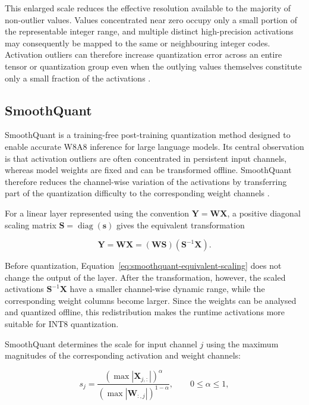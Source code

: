 This enlarged scale reduces the effective resolution available to the
majority of non-outlier values. Values concentrated near zero occupy
only a small portion of the representable integer range, and multiple
distinct high-precision activations may consequently be mapped to the
same or neighbouring integer codes. Activation outliers can therefore
increase quantization error across an entire tensor or quantization
group even when the outlying values themselves constitute only a small
fraction of the activations
\cite{xiao2023icml-smoothquant}.

\subsection{SmoothQuant}
SmoothQuant is a training-free post-training quantization method
designed to enable accurate W8A8 inference for large language models.
Its central observation is that activation outliers are often
concentrated in persistent input channels, whereas model weights are
fixed and can be transformed offline. SmoothQuant therefore reduces
the channel-wise variation of the activations by transferring part of
the quantization difficulty to the corresponding weight channels
\cite{xiao2023smoothquant}.

For a linear layer represented using the convention
\(\mathbf{Y}=\mathbf{W}\mathbf{X}\), a positive diagonal scaling matrix
\(\mathbf{S}=\operatorname{diag}(\mathbf{s})\) gives the equivalent
transformation

\begin{equation}
\mathbf{Y}
=
\mathbf{W}\mathbf{X}
=
\left(\mathbf{W}\mathbf{S}\right)
\left(\mathbf{S}^{-1}\mathbf{X}\right).
\label{eq:smoothquant-equivalent-scaling}
\end{equation}

Before quantization, Equation~\eqref{eq:smoothquant-equivalent-scaling}
does not change the output of the layer. After the transformation,
however, the scaled activations
\(\mathbf{S}^{-1}\mathbf{X}\) have a smaller channel-wise dynamic range,
while the corresponding weight columns become larger. Since the
weights can be analysed and quantized offline, this redistribution makes
the runtime activations more suitable for INT8 quantization.

SmoothQuant determines the scale for input channel \(j\) using the
maximum magnitudes of the corresponding activation and weight channels:

\begin{equation}
s_j
=
\frac{
\left(
\max |\mathbf{X}_{j,:}|
\right)^{\alpha}
}{
\left(
\max |\mathbf{W}_{:,j}|
\right)^{1-\alpha}
},
\qquad
0\leq\alpha\leq1,
\label{eq:smoothquant-scale}
\end{equation}

